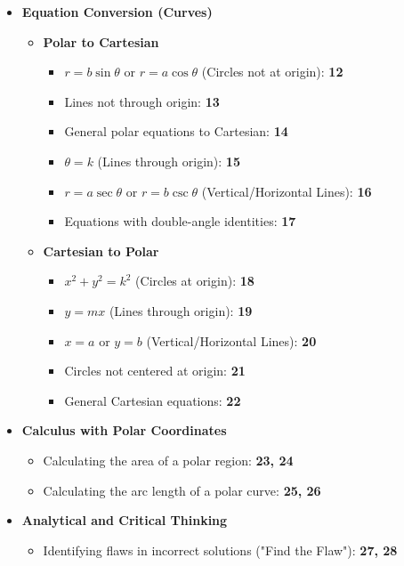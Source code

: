\documentclass{article}
\begin{document}
\begin{itemize}
    \item \textbf{Equation Conversion (Curves)}
    \begin{itemize}
        \item \textbf{Polar to Cartesian}
        \begin{itemize}
            \item $r = b\sin\theta$ or $r = a\cos\theta$ (Circles not at origin): \textbf{12}
            \item Lines not through origin: \textbf{13}
            \item General polar equations to Cartesian: \textbf{14}
            \item $\theta = k$ (Lines through origin): \textbf{15}
            \item $r = a\sec\theta$ or $r=b\csc\theta$ (Vertical/Horizontal Lines): \textbf{16}
            \item Equations with double-angle identities: \textbf{17}
        \end{itemize}
        \item \textbf{Cartesian to Polar}
        \begin{itemize}
            \item $x^2 + y^2 = k^2$ (Circles at origin): \textbf{18}
            \item $y = mx$ (Lines through origin): \textbf{19}
            \item $x=a$ or $y=b$ (Vertical/Horizontal Lines): \textbf{20}
            \item Circles not centered at origin: \textbf{21}
            \item General Cartesian equations: \textbf{22}
        \end{itemize}
    \end{itemize}

    \item \textbf{Calculus with Polar Coordinates}
    \begin{itemize}
        \item Calculating the area of a polar region: \textbf{23, 24}
        \item Calculating the arc length of a polar curve: \textbf{25, 26}
    \end{itemize}

    \item \textbf{Analytical and Critical Thinking}
    \begin{itemize}
        \item Identifying flaws in incorrect solutions ("Find the Flaw"): \textbf{27, 28}
    \end{itemize}
\end{itemize}
\end{document}
